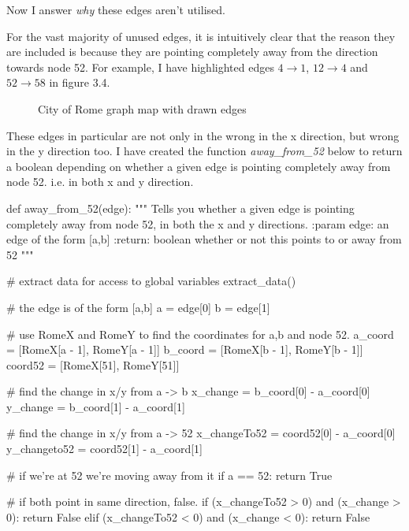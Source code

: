 \documentclass[paper=a4, fontsize=12pt]{scrartcl} %
\numberwithin{equation}{section}       %
\numberwithin{figure}{section}         %
\numberwithin{table}{section}          %
\begin{document}
\begin{enumerate}
Now I answer \textit{why} these edges aren't utilised. 


For the vast majority of unused edges, it is intuitively clear that the reason they are included is because they are pointing completely away from the direction towards node 52. For example, I have highlighted edges $4 \to 1$, $12 \to 4$ and $52 \to 58$ in figure 3.4.

\begin{figure}[h]
\caption{City of Rome graph map with drawn edges}
\centering

\end{figure}
 
These edges in particular are not only in the wrong in the x direction, but wrong in the y direction too. I have created the function \textit{away\_from\_52} below to return a boolean depending on whether a given edge is pointing completely away from node 52. i.e. in both x and y direction.

\leavevmode
\newline
\leavevmode
\newline



\begin{python}
def away_from_52(edge):
    """
    Tells you whether a given edge is pointing completely away from
    node 52, in both the x and y directions.
    :param edge: an edge of the form [a,b]
    :return: boolean whether or not this points to or away from 52
    """

    # extract data for access to global variables
    extract_data()

    # the edge is of the form [a,b]
    a = edge[0]
    b = edge[1]

    # use RomeX and RomeY to find the coordinates for a,b and node 52.
    a_coord = [RomeX[a - 1], RomeY[a - 1]]
    b_coord = [RomeX[b - 1], RomeY[b - 1]]
    coord52 = [RomeX[51], RomeY[51]]

    # find the change in x/y from a -> b
    x_change = b_coord[0] - a_coord[0]
    y_change = b_coord[1] - a_coord[1]

    # find the change in x/y from a -> 52
    x_changeTo52 = coord52[0] - a_coord[0]
    y_changeto52 = coord52[1] - a_coord[1]

    # if we're at 52 we're moving away from it
    if a == 52:
        return True

    # if both point in same direction, false.
    if (x_changeTo52 > 0) and (x_change > 0):
        return False
    elif (x_changeTo52 < 0) and (x_change < 0):
        return False


\end{python}
\end{enumerate}
\end{document}
